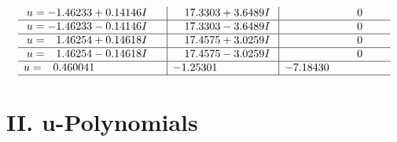 \documentclass[1p]{elsarticle_modified}
\theoremstyle{definition}
\begin{document}
$$\begin{array}{c|c|c}
\begin{aligned}
u &= -1.46233 + 0.14146 I\end{aligned}
 & \phantom{-}17.3303 + 3.6489 I & \phantom{-0.000000 } 0 \\ \hline\begin{aligned}
u &= -1.46233 - 0.14146 I\end{aligned}
 & \phantom{-}17.3303 - 3.6489 I & \phantom{-0.000000 } 0 \\ \hline\begin{aligned}
u &= \phantom{-}1.46254 + 0.14618 I\end{aligned}
 & \phantom{-}17.4575 + 3.0259 I & \phantom{-0.000000 } 0 \\ \hline\begin{aligned}
u &= \phantom{-}1.46254 - 0.14618 I\end{aligned}
 & \phantom{-}17.4575 - 3.0259 I & \phantom{-0.000000 } 0 \\ \hline\begin{aligned}
u &= \phantom{-}0.460041\phantom{ +0.000000I}\end{aligned}
 & -1.25301\phantom{ +0.000000I} & -7.18430\phantom{ +0.000000I}\\
 \hline 
 \end{array}$$\newpage
\newpage\renewcommand{\arraystretch}{1}
\centering \section*{ II. u-Polynomials}
\end{document}
